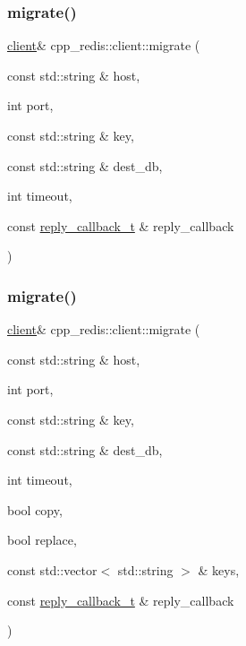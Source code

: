 \subsubsection{\texorpdfstring{migrate()}{migrate()}\hspace{0.1cm}{\footnotesize\ttfamily [1/3]}}
{\footnotesize\ttfamily \hyperlink{classcpp__redis_1_1client}{client}\& cpp\+\_\+redis\+::client\+::migrate (\begin{DoxyParamCaption}\item[{const std\+::string \&}]{host,  }\item[{int}]{port,  }\item[{const std\+::string \&}]{key,  }\item[{const std\+::string \&}]{dest\+\_\+db,  }\item[{int}]{timeout,  }\item[{const \hyperlink{classcpp__redis_1_1client_a061a1140d36d2eaeda82b09a0bb3f9f2}{reply\+\_\+callback\+\_\+t} \&}]{reply\+\_\+callback }\end{DoxyParamCaption})}

\mbox{\label{classcpp__redis_1_1client_a671442669b8fe540bfc7d02c05a74207}} 
\subsubsection{\texorpdfstring{migrate()}{migrate()}\hspace{0.1cm}{\footnotesize\ttfamily [2/3]}}
{\footnotesize\ttfamily \hyperlink{classcpp__redis_1_1client}{client}\& cpp\+\_\+redis\+::client\+::migrate (\begin{DoxyParamCaption}\item[{const std\+::string \&}]{host,  }\item[{int}]{port,  }\item[{const std\+::string \&}]{key,  }\item[{const std\+::string \&}]{dest\+\_\+db,  }\item[{int}]{timeout,  }\item[{bool}]{copy,  }\item[{bool}]{replace,  }\item[{const std\+::vector$<$ std\+::string $>$ \&}]{keys,  }\item[{const \hyperlink{classcpp__redis_1_1client_a061a1140d36d2eaeda82b09a0bb3f9f2}{reply\+\_\+callback\+\_\+t} \&}]{reply\+\_\+callback }\end{DoxyParamCaption})}

